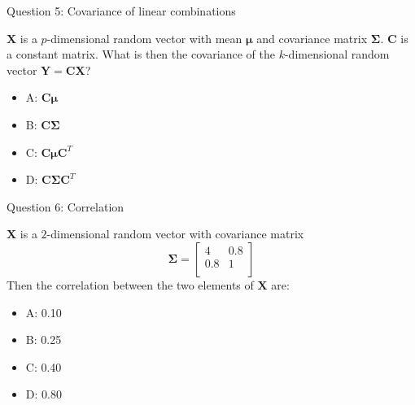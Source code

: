 \documentclass[ignorenonframetext,]{beamer}
\providecommand{\tightlist}{%
  \setlength{\itemsep}{0pt}\setlength{\parskip}{0pt}}
\begin{document}
\begin{frame}

\begin{block}{Question 5: Covariance of linear combinations}

\vspace{2mm}

\(\boldsymbol{X}\) is a \(p\)-dimensional random vector with mean
\(\boldsymbol{\mu}\) and covariance matrix \(\boldsymbol\Sigma\).
\(\boldsymbol{C}\) is a constant matrix. What is then the covariance of
the \(k\)-dimensional random vector
\(\boldsymbol{Y}=\boldsymbol{C}\boldsymbol{X}\)?

\begin{itemize}
\tightlist
\item
  A: \(\boldsymbol{C}\boldsymbol{\mu}\)
\item
  B: \(\boldsymbol{C}\boldsymbol\Sigma\)
\item
  C: \(\boldsymbol{C}\boldsymbol{\mu}\boldsymbol{C}^T\)
\item
  D: \(\boldsymbol{C}\boldsymbol\Sigma\boldsymbol{C}^T\)
\end{itemize}

\end{block}

\end{frame}

\begin{frame}

\begin{block}{Question 6: Correlation}

\vspace{2mm}

\(\boldsymbol{X}\) is a \(2\)-dimensional random vector with covariance
matrix \[ \boldsymbol\Sigma= \left[\begin{array}{cc}
          4 & 0.8 \\
          0.8 & 1\\
      \end{array}
    \right]\] Then the correlation between the two elements of
\(\boldsymbol{X}\) are:

\begin{itemize}
\tightlist
\item
  A: 0.10
\item
  B: 0.25
\item
  C: 0.40
\item
  D: 0.80
\end{itemize}

\end{block}

\end{frame}
\end{document}
